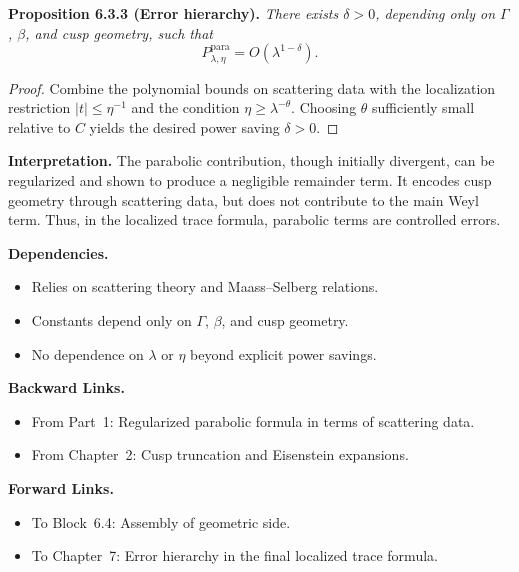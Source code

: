 \medskip

\noindent\textbf{Proposition 6.3.3 (Error hierarchy).}
\emph{There exists $\delta>0$, depending only on $\Gamma$, $\beta$, and cusp geometry, such that}
\[
  P_{\lambda,\eta}^{\text{para}} = O(\lambda^{1-\delta}).
\]

\begin{proof}
Combine the polynomial bounds on scattering data with the localization restriction $|t|\le \eta^{-1}$ and the condition $\eta \ge \lambda^{-\theta}$.  
Choosing $\theta$ sufficiently small relative to $C$ yields the desired power saving $\delta>0$.
\end{proof}

\medskip

\noindent\textbf{Interpretation.}
The parabolic contribution, though initially divergent, can be regularized and shown to produce a negligible remainder term.  
It encodes cusp geometry through scattering data, but does not contribute to the main Weyl term.  
Thus, in the localized trace formula, parabolic terms are controlled errors.

\medskip

\noindent\textbf{Dependencies.}
\begin{itemize}
  \item Relies on scattering theory and Maass–Selberg relations.
  \item Constants depend only on $\Gamma$, $\beta$, and cusp geometry.
  \item No dependence on $\lambda$ or $\eta$ beyond explicit power savings.
\end{itemize}

\medskip

\noindent\textbf{Backward Links.}
\begin{itemize}
  \item From Part~1: Regularized parabolic formula in terms of scattering data.
  \item From Chapter~2: Cusp truncation and Eisenstein expansions.
\end{itemize}

\medskip

\noindent\textbf{Forward Links.}
\begin{itemize}
  \item To Block~6.4: Assembly of geometric side.
  \item To Chapter~7: Error hierarchy in the final localized trace formula.
\end{itemize}

\medskip

